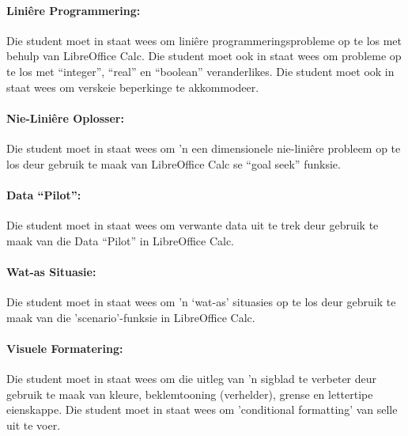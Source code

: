             \paragraph{Lini\^{e}re Programmering:}
                Die student moet in staat wees om lini\^{e}re programmeringsprobleme
                op te los met behulp van LibreOffice Calc. Die student
                moet ook in staat wees om probleme op te los met ``integer'', ``real''
                en ``boolean'' veranderlikes.  Die student moet ook in staat wees om 
                verskeie beperkinge te akkommodeer.

            \paragraph{Nie-Lini\^{e}re Oplosser:}
                Die student moet in staat wees om 'n een dimensionele nie-lini\^{e}re 
                probleem op te los deur gebruik te maak van LibreOffice Calc se 
                ``goal seek'' funksie.

            \paragraph{Data ``Pilot'':}
		Die student moet in staat wees om verwante data uit te trek 
		deur gebruik te maak van die Data ``Pilot'' in LibreOffice Calc.

            \paragraph{Wat-as Situasie:}
                Die student moet in staat wees om 'n `wat-as' situasies op te los 
                deur gebruik te maak van die 'scenario'-funksie  in LibreOffice Calc.

            \paragraph{Visuele Formatering:}
                Die student moet in staat wees om die uitleg van 'n sigblad te verbeter
                deur gebruik te maak van kleure, beklemtooning (verhelder), grense en lettertipe
                eienskappe.  Die student moet in staat wees om 'conditional formatting' 
                van selle uit te voer.
